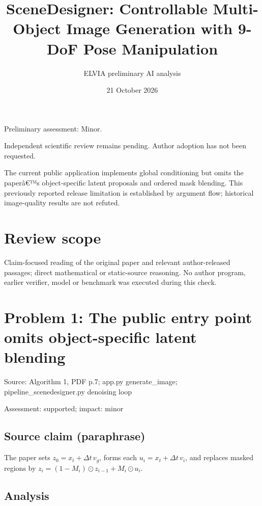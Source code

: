 \documentclass[11pt]{article}
\begin{document}
\title{SceneDesigner: Controllable Multi-Object Image Generation with 9-DoF Pose Manipulation}

\author{ELVIA preliminary AI analysis}\date{21 October 2026}\maketitle

Preliminary assessment: Minor.\par

Independent scientific review remains pending. Author adoption has not been requested.

The current public application implements global conditioning but omits the paperâ€™s object-specific latent proposals and ordered mask blending. This previously reported release limitation is established by argument flow; historical image-quality results are not refuted.

\section*{Review scope}

Claim-focused reading of the original paper and relevant author-released passages; direct mathematical or static-source reasoning. No author program, earlier verifier, model or benchmark was executed during this check.

\section*{Problem 1: The public entry point omits object-specific latent blending}

Source: Algorithm 1, PDF p.7; app.py generate\_image; pipeline\_scenedesigner.py denoising loop

Assessment: supported; impact: minor

\subsection*{Source claim (paraphrase)}

The paper sets \(z_0=x_t+\Delta t\,v_g\), forms each \(u_i=x_t+\Delta t\,v_i\), and replaces masked regions by \(z_i=(1-M_i)\odot z_{i-1}+M_i\odot u_i\).

\subsection*{Analysis}
\end{document}
